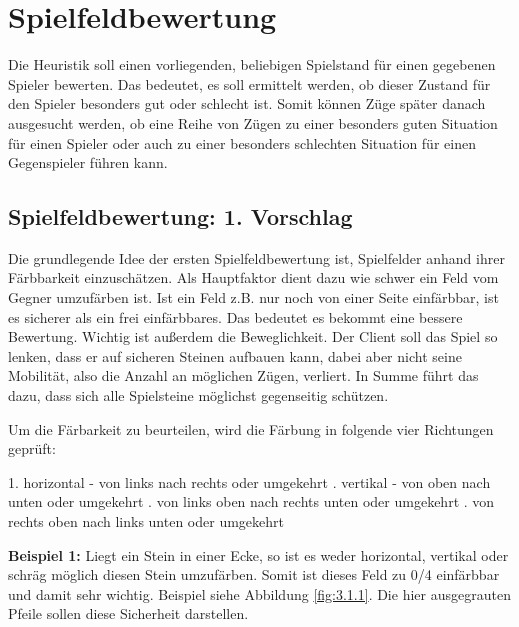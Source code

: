 \documentclass[12pt,a4paper,bibliography=totocnumbered,listof=totocnumbered]{scrartcl}
\begin{document}
    \section{Spielfeldbewertung}
    \vspace{1em}
    Die Heuristik soll einen vorliegenden, beliebigen Spielstand für einen gegebenen Spieler bewerten. Das bedeutet, es soll ermittelt werden, ob dieser Zustand für den Spieler besonders gut oder schlecht ist. Somit können Züge später danach ausgesucht werden, ob eine Reihe von Zügen zu einer besonders guten Situation für einen Spieler oder auch zu einer besonders schlechten Situation für einen Gegenspieler führen kann.
    
    \subsection{Spielfeldbewertung: 1. Vorschlag}
    \vspace{1em}
	Die grundlegende Idee der ersten Spielfeldbewertung ist, Spielfelder anhand ihrer \glqq Färbbarkeit\grqq{} einzuschätzen. Als Hauptfaktor dient dazu wie schwer ein Feld vom Gegner umzufärben ist. Ist ein Feld z.B. nur noch von einer Seite einfärbbar, ist es sicherer als ein frei einfärbbares. Das bedeutet es bekommt eine bessere Bewertung. Wichtig ist außerdem die Beweglichkeit. Der Client soll das Spiel so lenken, dass er auf sicheren Steinen aufbauen kann, dabei aber nicht seine Mobilität, also die Anzahl an möglichen Zügen, verliert. In Summe führt das dazu, dass sich alle Spielsteine möglichst gegenseitig schützen.


    Um die Färbarkeit zu beurteilen, wird die Färbung in folgende vier Richtungen geprüft:

    1. horizontal - von links nach rechts oder umgekehrt . vertikal - von oben nach unten oder umgekehrt . von links oben nach rechts unten oder umgekehrt . von rechts oben nach links unten oder umgekehrt \newline


    \textbf{Beispiel 1:} Liegt ein Stein in einer Ecke, so ist es weder horizontal, vertikal oder schräg möglich diesen Stein umzufärben. Somit ist dieses Feld zu 0/4 einfärbbar und damit sehr wichtig. Beispiel siehe Abbildung \ref{fig:3.1.1}. Die hier ausgegrauten Pfeile sollen diese Sicherheit darstellen.
\end{document}
